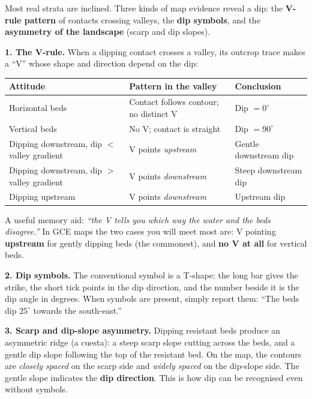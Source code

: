 \documentclass[11pt]{article}
\newcommand{\cle}[1]{{\popxbold\color{popdark}#1}}
\begin{document}
Most real strata are inclined. Three kinds of map evidence reveal a dip: the \textbf{V-rule pattern} of contacts crossing valleys, the \textbf{dip symbols}, and the \textbf{asymmetry of the landscape} (scarp and dip slopes).

\textbf{1. The V-rule.} When a dipping contact crosses a valley, its outcrop trace makes a ``V'' whose shape and direction depend on the dip:

\begin{center}
\begin{tabularx}{\linewidth}{|l|X|X|}
\hline
\rowcolor{popblueL} \textbf{Attitude} & \textbf{Pattern in the valley} & \textbf{Conclusion} \\
\hline
Horizontal beds & Contact follows contour; no distinct V & Dip $= 0^\circ$ \\
\hline
Vertical beds & No V; contact is straight & Dip $= 90^\circ$ \\
\hline
Dipping downstream, dip $<$ valley gradient & V points \emph{upstream} & Gentle downstream dip \\
\hline
Dipping downstream, dip $>$ valley gradient & V points \emph{downstream} & Steep downstream dip \\
\hline
Dipping upstream & V points \emph{downstream} & Upstream dip \\
\hline
\end{tabularx}
\end{center}

A useful memory aid: \emph{``the V tells you which way the water and the beds disagree.''} In GCE maps the two cases you will meet most are: V pointing \textbf{upstream} for gently dipping beds (the commonest), and \textbf{no V at all} for vertical beds.

\textbf{2. Dip symbols.} The conventional symbol is a T-shape: the long bar gives the \cle{strike}, the short tick points in the \cle{dip direction}, and the number beside it is the \cle{dip angle} in degrees. When symbols are present, simply report them: ``The beds dip $25^\circ$ towards the south-east.''

\textbf{3. Scarp and dip-slope asymmetry.} Dipping resistant beds produce an asymmetric ridge (a \cle{cuesta}): a steep \cle{scarp slope} cutting across the beds, and a gentle \cle{dip slope} following the top of the resistant bed. On the map, the contours are \emph{closely spaced} on the scarp side and \emph{widely spaced} on the dip-slope side. The gentle slope indicates the \textbf{dip direction}. This is how dip can be recognised even without symbols.
\end{document}
